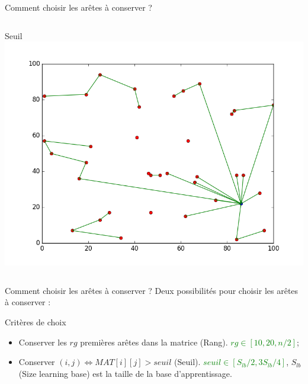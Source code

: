 \documentclass{beamer}
\begin{document}
\begin{frame}{Comment choisir les arêtes à conserver ?}
\begin{columns}[t]
 
  \begin{column}{4cm}
  	\centering
  	Seuil
	\includegraphics[scale=0.2]{edges_seuil.png}
	
  \end{column}
\end{columns}  
\end{frame}

\begin{frame}{Comment choisir les arêtes à conserver ?}
Deux possibilités pour choisir les arêtes à conserver :
\begin{block}{Critères de choix}
\begin{itemize}
\item Conserver les $rg$ premières arêtes dans la matrice (Rang). \textcolor{green}{$rg \in [10,20,n/2]$};
\item Conserver $(i,j) \Leftrightarrow MAT[i][j] > seuil$ (Seuil). \textcolor{green}{$seuil \in [S_{lb}/2,3S_{lb}/4]$}, $S_{lb}$ (Size learning base) est la taille de la base d'apprentissage.
\end{itemize}
\end{block}
\end{frame}
\end{document}
